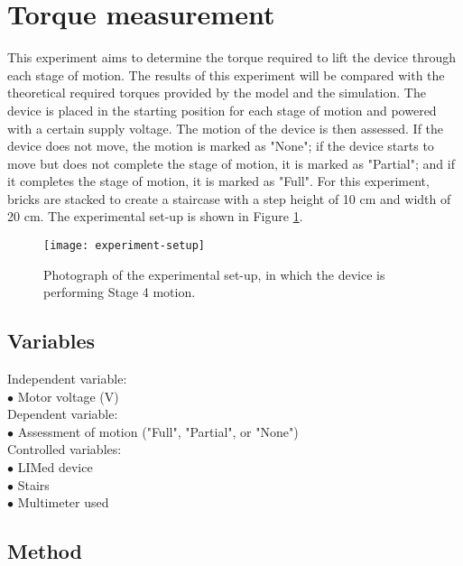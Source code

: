 \section{Torque measurement}
This experiment aims to determine the torque required to lift the device through each stage of motion. The results of this experiment will be compared with the theoretical required torques provided by the model and the simulation. The device is placed in the starting position for each stage of motion and powered with a certain supply voltage. The motion of the device is then assessed. If the device does not move, the motion is marked as "None"; if the device starts to move but does not complete the stage of motion, it is marked as "Partial"; and if it completes the stage of motion, it is marked as "Full". For this experiment, bricks are stacked to create a staircase with a step height of 10 cm and width of 20 cm. The experimental set-up is shown in Figure \ref{fig:experiment-setup}.\\

\begin{figure}[!h]
	\centering
	\texttt{[image: experiment-setup]}
	\caption{Photograph of the experimental set-up, in which the device is performing Stage 4 motion.}
	\label{fig:experiment-setup}
\end{figure}

\subsection{Variables}
Independent variable:\\
$\bullet$ Motor voltage (V)\\
Dependent variable:\\
$\bullet$ Assessment of motion ("Full", "Partial", or "None")\\
Controlled variables:\\
$\bullet$ LIMed device\\
$\bullet$ Stairs\\
$\bullet$ Multimeter used\\


\subsection{Method}

